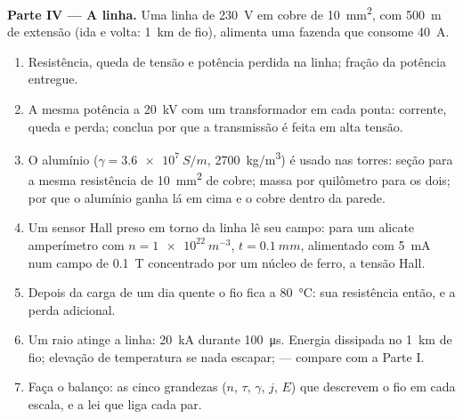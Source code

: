 \begin{problem}
\medskip
\noindent\textbf{Parte IV --- A linha.}
Uma linha de \qty{230}{V} em cobre de \qty{10}{mm^2}, com \qty{500}{m} de extensão (ida e volta:
\qty{1}{km} de fio), alimenta uma fazenda que consome \qty{40}{A}.
\begin{enumerate}[resume]
  \item Resistência, queda de tensão e potência perdida na linha; fração
        da potência entregue.
  \item A mesma potência a \qty{20}{kV} com um transformador em cada ponta:
        corrente, queda e perda; conclua por que a transmissão é feita em
        alta tensão.
  \item O alumínio ($\gamma = \qty{3.6e7}{S/m}$, \qty{2700}{kg/m^3}) é usado nas
        torres: seção para a mesma resistência de \qty{10}{mm^2} de
        cobre; massa por quilômetro para os dois; por que o alumínio ganha lá
        em cima e o cobre dentro da parede.
  \item Um sensor Hall preso em torno da linha lê seu campo: para
        um alicate amperímetro com $n = \qty{1e22}{m^{-3}}$, $t = \qty{0.1}{mm}$, alimentado com
        \qty{5}{mA} num campo de \qty{0.1}{T} concentrado por um núcleo de ferro,
        a tensão Hall.
  \item Depois da carga de um dia quente o fio fica a \qty{80}{\degreeCelsius}:
        sua resistência então, e a perda adicional.
  \item Um raio atinge a linha: \qty{20}{kA} durante \qty{100}{\micro s}. Energia
        dissipada no \qty{1}{km} de fio; elevação de temperatura se nada
        escapar;  --- compare com a Parte I.
  \item Faça o balanço: as cinco grandezas ($n$, $\tau$, $\gamma$, $j$, $E$) que
        descrevem o fio em cada escala, e a lei que liga cada
        par.
\end{enumerate}
\end{problem}
